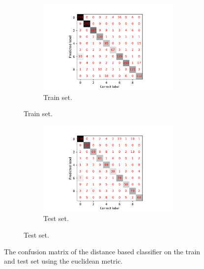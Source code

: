 \documentclass[10 pt, a4paper]{article}
\begin{document}
\begin{figure}[H] 
\begin{subfigure}[b]{0.5\textwidth}
\begin{figure}[H]
\includegraphics[width=\textwidth]{distanceConfusionTrain}
\caption{Train set.}
\end{figure}
\end{subfigure}
\begin{subfigure}[b]{0.5\textwidth}
\begin{figure}[H] 
\includegraphics[width=\textwidth]{distanceConfusionTest}
\caption{Test set.}
\end{figure}
\end{subfigure}
\caption{The confusion matrix of the distance based classifier on the train and test set using the euclidean metric.}
\label{fig:euccom}
\end{figure}
\end{document}
